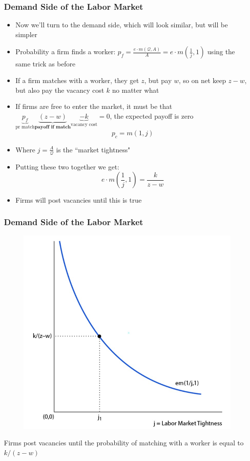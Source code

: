 \documentclass{beamer}
\begin{document}
\begin{frame}
\frametitle[alignment=center]{Demand Side of the Labor Market}
\begin{itemize}
\item Now we'll turn to the demand side, which will look similar, but will be simpler
\bigskip
\item Probability a firm finds a worker: $p_f=\frac{e\cdot m(\mathcal{Q},A)}{A}=e\cdot m(\frac{1}{j},1)$ using the same trick as before
\bigskip
\item If a firm matches with a worker, they get $z$, but pay $w$, so on net keep $z-w$, but also pay the vacancy cost $k$ no matter what
\bigskip
\item If firms are free to enter the market, it must be that $\underbrace{p_f}_{\text{pr match}}\underbrace{(z-w)}_{\textbf{payoff if match}}\underbrace{-k}_{\text{vacancy cost}}=0$, the expected payoff is zero 
$$p_c=m(1,j)$$
\item Where $j=\frac{A}{\mathcal{Q}}$ is the ``market tightness"
\bigskip
\item Putting these two together we get:
$$e\cdot m\left(\frac{1}{j},1\right)=\frac{k}{z-w}$$
\item Firms will post vacancies until this is true
\end{itemize}
\end{frame}

 
\begin{frame}
\frametitle[alignment=center]{Demand Side of the Labor Market}
\begin{figure}
\centering
\includegraphics[scale=0.5]{Figures/W_Fig_6pt19.png}
\end{figure}
Firms post vacancies until the probability of matching with a worker is equal to $k/(z-w)$
\end{frame}
\end{document}

